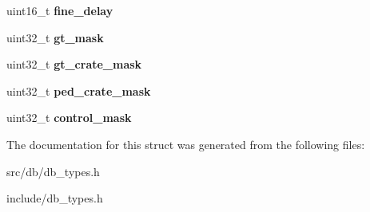 \begin{DoxyCompactItemize}
\item 
\hypertarget{structmtcd__t_aca78d3e7daff65fa61bfc5379496b413}{
uint16\_\-t {\bfseries fine\_\-delay}}
\label{structmtcd__t_aca78d3e7daff65fa61bfc5379496b413}

\item 
\hypertarget{structmtcd__t_a195b574879ee83d360a7894d17031d68}{
uint32\_\-t {\bfseries gt\_\-mask}}
\label{structmtcd__t_a195b574879ee83d360a7894d17031d68}

\item 
\hypertarget{structmtcd__t_acd349d86e796cc06241a099dd77ded7c}{
uint32\_\-t {\bfseries gt\_\-crate\_\-mask}}
\label{structmtcd__t_acd349d86e796cc06241a099dd77ded7c}

\item 
\hypertarget{structmtcd__t_a63dffac8486436a2894d8b827612df39}{
uint32\_\-t {\bfseries ped\_\-crate\_\-mask}}
\label{structmtcd__t_a63dffac8486436a2894d8b827612df39}

\item 
\hypertarget{structmtcd__t_ada3ec741c73d0b39aba3c3470508b315}{
uint32\_\-t {\bfseries control\_\-mask}}
\label{structmtcd__t_ada3ec741c73d0b39aba3c3470508b315}

\end{DoxyCompactItemize}


The documentation for this struct was generated from the following files:\begin{DoxyCompactItemize}
\item 
src/db/db\_\-types.h\item 
include/db\_\-types.h\end{DoxyCompactItemize}
